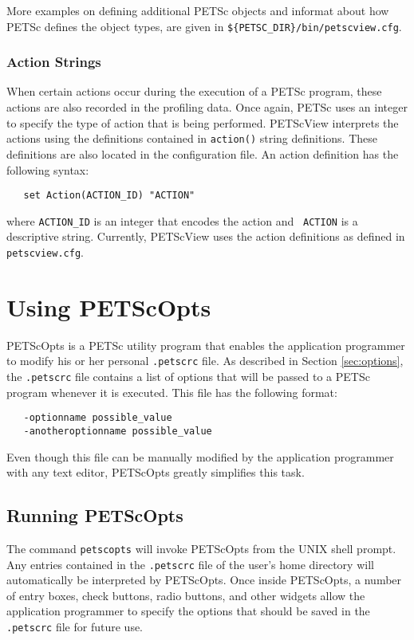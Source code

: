 {More examples on defining additional PETSc objects and informat
about how PETSc defines the object types, are given in 
{\tt \$\{PETSC\_DIR\}/bin/petscview.cfg}.

\subsubsection{Action Strings}

When certain actions occur during the execution of a PETSc program,
these actions are also recorded in the profiling data.  Once again,
PETSc uses an integer to specify the type of action that is being
performed.  PETScView interprets the actions using the
definitions contained in {\tt action()} string definitions.  These
definitions are also located in the configuration file.  An action
definition has the following syntax:
\begin{verbatim}
   set Action(ACTION_ID) "ACTION"
\end{verbatim}
where {\tt ACTION\_ID} is an integer that encodes the action and {\tt
ACTION} is a descriptive string.  Currently, PETScView uses the action
definitions as defined in {\tt petscview.cfg}.

\section{Using PETScOpts}
\label{sec:petscopts}

PETScOpts is a PETSc utility program that enables the application
programmer to modify his or her personal {\tt .petscrc} file.  As
described in Section \ref{sec:options}, the {\tt .petscrc} file
contains a list of options that will be passed to a PETSc program
whenever it is executed.  This file has the following format:
\begin{verbatim}
   -optionname possible_value
   -anotheroptionname possible_value
\end{verbatim}
Even though this file can be manually modified by the application
programmer with any text editor, PETScOpts greatly simplifies this
task.

\subsection{Running PETScOpts}

The command {\tt petscopts} will invoke PETScOpts from the UNIX
shell prompt.  Any entries contained in the {\tt .petscrc} file of the
user's home directory will automatically be interpreted by PETScOpts.
Once inside PETScOpts, a number of entry boxes, check
buttons, radio buttons, and other widgets allow the application
programmer to specify the options that should be saved in the {\tt
.petscrc} file for future use.

}
